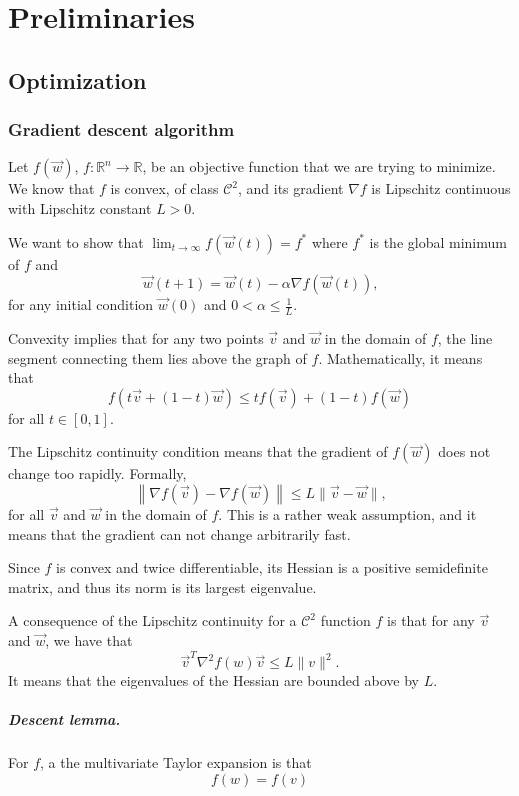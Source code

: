 \chapter{Preliminaries}
\label{chap:preliminaries}

\section{Optimization}

\subsection{Gradient descent algorithm}

Let $f(\vec{w})$, $f : \mathbb{R}^n \rightarrow \mathbb{R}$, be an objective function that
we are trying to minimize.  We know that
$f$ is convex, of class $\mathcal{C}^2$, and its gradient $\nabla f$ is Lipschitz continuous with Lipschitz
constant $L > 0$.

We want to show that $\lim_{t\rightarrow\infty} f(\vec{w}(t)) = f^{*}$ where $f^{*}$
is the global minimum of $f$ and $$\vec{w}(t+1) = \vec{w}(t) - \alpha \nabla f(\vec{w}(t))\mbox{,}$$
for any initial condition $\vec{w}(0)$ and $0 < \alpha \leq \frac{1}{L}$.

Convexity implies that for any two points $\vec{v}$ and $\vec{w}$ in the domain of
$f$, the line segment connecting them lies above the graph of $f$.  Mathematically, it
means that $$f(t\vec{v} + (1 - t) \vec{w}) \leq t f(\vec{v}) + (1 - t)
f(\vec{w})$$ for all $t \in [0, 1]$.

The Lipschitz continuity condition means that the gradient of $f(\vec{w})$ does not change too rapidly.
Formally, $$\left\|\nabla f(\vec{v}) - \nabla f(\vec{w})\right\| \leq L \|\vec{v} - \vec{w}\|\mbox{,}$$
for all $\vec{v}$ and $\vec{w}$ in the domain of $f$.  This is a rather weak
assumption, and it means that the gradient can not change arbitrarily fast.

Since $f$ is convex and twice differentiable, its Hessian is a positive semidefinite
matrix, and thus its norm is its largest eigenvalue.

A consequence of the Lipschitz continuity for a $\mathcal{C}^2$ function $f$ is that for
any $\vec{v}$ and $\vec{w}$, we have that
\begin{equation}
  \label{eq:lcg1}
  \vec{v}^T \nabla^2 f(w) \vec{v} \leq L \|v\|^2\text{.}
\end{equation}
It means that the eigenvalues of the Hessian are bounded above by $L$.

\paragraph{Descent lemma.}  For $f$, a the multivariate Taylor expansion is that
$$f(w) = f(v)$$
